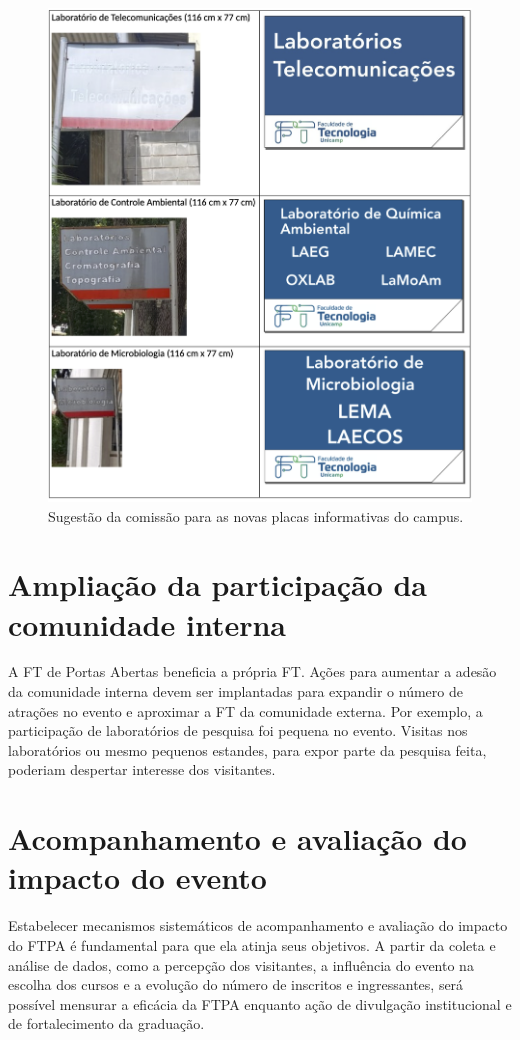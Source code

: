 \documentclass[
  letterpaper,
  DIV=11,
  numbers=noendperiod]{scrreprt}
\begin{document}
\begin{figure}[H]

{\centering \includegraphics[width=0.6\linewidth,height=\textheight,keepaspectratio]{recomendacoes/placas.png}

}

\caption{Sugestão da comissão para as novas placas informativas do
campus.}

\end{figure}%

\section{Ampliação da participação da comunidade
interna}\label{ampliauxe7uxe3o-da-participauxe7uxe3o-da-comunidade-interna}

A FT de Portas Abertas beneficia a própria FT. Ações para aumentar a
adesão da comunidade interna devem ser implantadas para expandir o
número de atrações no evento e aproximar a FT da comunidade externa. Por
exemplo, a participação de laboratórios de pesquisa foi pequena no
evento. Visitas nos laboratórios ou mesmo pequenos estandes, para expor
parte da pesquisa feita, poderiam despertar interesse dos visitantes.

\section{Acompanhamento e avaliação do impacto do
evento}\label{acompanhamento-e-avaliauxe7uxe3o-do-impacto-do-evento}

Estabelecer mecanismos sistemáticos de acompanhamento e avaliação do
impacto do FTPA é fundamental para que ela atinja seus objetivos. A
partir da coleta e análise de dados, como a percepção dos visitantes, a
influência do evento na escolha dos cursos e a evolução do número de
inscritos e ingressantes, será possível mensurar a eficácia da FTPA
enquanto ação de divulgação institucional e de fortalecimento da
graduação.
\end{document}
